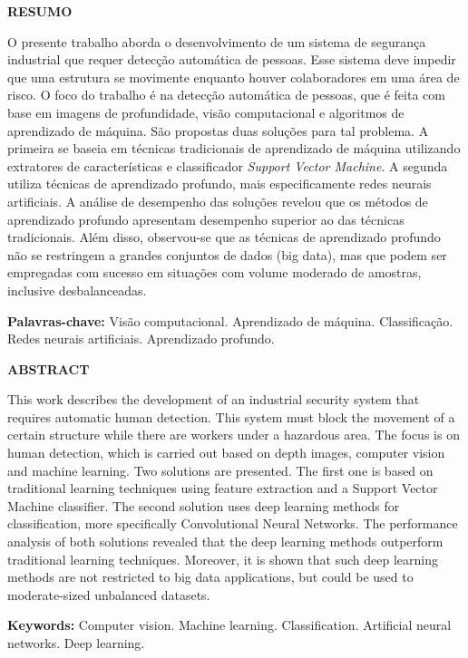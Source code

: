 \thispagestyle{plain}

\medskip

\begin{center}
  \textbf{RESUMO}
\end{center}



\bigskip


O presente trabalho aborda o desenvolvimento de um sistema de segurança industrial que requer detecção automática de pessoas. Esse sistema deve impedir que uma estrutura se movimente enquanto houver colaboradores em uma área de risco. O foco do trabalho é na detecção automática de pessoas, que é feita com base em imagens de profundidade, visão computacional e algoritmos de aprendizado de máquina. São propostas duas soluções para tal problema. A primeira se baseia em técnicas tradicionais de aprendizado de máquina utilizando extratores de características e classificador \textit{Support Vector Machine}. A segunda utiliza técnicas de aprendizado profundo, mais especificamente redes neurais artificiais. A análise de desempenho das soluções revelou que os métodos de aprendizado profundo apresentam desempenho superior ao das técnicas tradicionais. Além disso, observou-se que as técnicas de aprendizado profundo não se restringem a grandes conjuntos de dados (big data), mas que podem ser empregadas com sucesso em situações com volume moderado de amostras, inclusive desbalanceadas.

\textbf{Palavras-chave:} Visão computacional. Aprendizado de máquina. Classificação. Redes neurais artificiais. Aprendizado profundo.

\cleardoublepageempty

\thispagestyle{plain}

\begin{center}
	\textbf{ABSTRACT}
\end{center}

\bigskip

This work describes the development of an industrial security system that requires automatic human detection. This system must block the movement of a certain structure while there are workers under a hazardous area. The focus is on human detection, which is carried out based on depth images, computer vision and machine learning. Two solutions are presented. The first one is based on traditional learning techniques using feature extraction and a Support Vector Machine classifier. The second solution uses deep learning methods for classification, more specifically Convolutional Neural Networks. The performance analysis of both solutions revealed that the deep learning methods outperform traditional learning techniques. Moreover, it is shown that such deep learning methods are not restricted to big data applications, but could be used to moderate-sized unbalanced datasets.

\textbf{Keywords:} Computer vision. Machine learning. Classification. Artificial neural networks. Deep learning.
